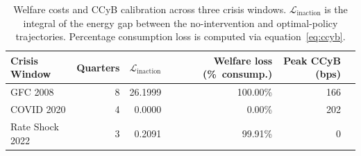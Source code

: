 \begin{table}[h]
\centering
\caption{Welfare costs and CCyB calibration across three crisis windows. $\mathcal{L}_{\mathrm{inaction}}$ is the integral of the energy gap between the no-intervention and optimal-policy trajectories. Percentage consumption loss is computed via equation~\eqref{eq:ccyb}.}
\label{tab:welfare}
\begin{tabular}{lrrrrr}
\toprule
Crisis Window & Quarters & $\mathcal{L}_{\mathrm{inaction}}$ & Welfare loss (\%~consump.) & Peak CCyB (bps) \\
\midrule
GFC 2008 & 8 & 26.1999 & 100.00\% & 166 \\
COVID 2020 & 4 & 0.0000 & 0.00\% & 202 \\
Rate Shock 2022 & 3 & 0.2091 & 99.91\% & 0 \\
\bottomrule
\end{tabular}
\end{table}
